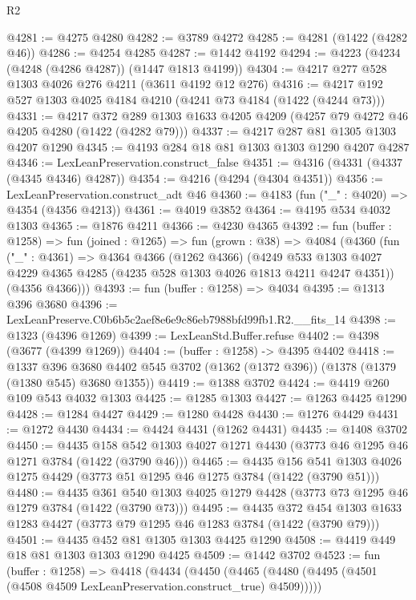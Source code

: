 \begin{lexlean}{R2}
\begin{coremodule}
@4281 := @4275 @4280
@4282 := @3789 @4272
@4285 := @4281 (@1422 (@4282 @46))
@4286 := @4254 @4285
@4287 := @1442 @4192
@4294 := @4223 (@4234 (@4248 (@4286 @4287)) (@1447 @1813 @4199))
@4304 := @4217 @277 @528 @1303 @4026 @276 @4211 (@3611 @4192 @12 @276)
@4316 := @4217 @192 @527 @1303 @4025 @4184 @4210 (@4241 @73 @4184 (@1422 (@4244 @73)))
@4331 := @4217
    @372
    @289
    @1303
    @1633
    @4205
    @4209
    (@4257 @79 @4272 @46 @4205 @4280 (@1422 (@4282 @79)))
@4337 := @4217 @287 @81 @1305 @1303 @4207 @1290
@4345 := @4193 @284 @18 @81 @1303 @1303 @1290 @4207 @4287
@4346 := LexLeanPreservation.construct_false
@4351 := @4316 (@4331 (@4337 (@4345 @4346) @4287))
@4354 := @4216 (@4294 (@4304 @4351))
@4356 := LexLeanPreservation.construct_adt @46
@4360 := @4183 (fun ("_" : @4020) => @4354 (@4356 @4213))
@4361 := @4019 @3852
@4364 := @4195 @534 @4032 @1303
@4365 := @1876 @4211
@4366 := @4230 @4365
@4392 := fun (buffer : @1258) =>
  fun (joined : @1265) =>
  fun (grown : @38) =>
  @4084
    (@4360
      (fun ("_" : @4361) =>
      @4364
        @4366
        (@1262 @4366)
        (@4249 @533 @1303 @4027 @4229 @4365 @4285 (@4235 @528 @1303 @4026 @1813 @4211 @4247 @4351))
        (@4356 @4366)))
@4393 := fun (buffer : @1258) => @4034
@4395 := @1313 @396 @3680
@4396 := LexLeanPreserve.C0b6b5c2aef8e6e9c86eb7988bfd99fb1.R2.__fits_14
@4398 := @1323 (@4396 @1269)
@4399 := LexLeanStd.Buffer.refuse
@4402 := @4398 (@3677 (@4399 @1269))
@4404 := (buffer : @1258) -> @4395 @4402
@4418 := @1337
    @396
    @3680
    @4402
    @545
    @3702
    (@1362 (@1372 @396))
    (@1378 (@1379 (@1380 @545) @3680 @1355))
@4419 := @1388 @3702
@4424 := @4419 @260 @109 @543 @4032 @1303
@4425 := @1285 @1303
@4427 := @1263 @4425 @1290
@4428 := @1284 @4427
@4429 := @1280 @4428
@4430 := @1276 @4429
@4431 := @1272 @4430
@4434 := @4424 @4431 (@1262 @4431)
@4435 := @1408 @3702
@4450 := @4435
    @158
    @542
    @1303
    @4027
    @1271
    @4430
    (@3773 @46 @1295 @46 @1271 @3784 (@1422 (@3790 @46)))
@4465 := @4435
    @156
    @541
    @1303
    @4026
    @1275
    @4429
    (@3773 @51 @1295 @46 @1275 @3784 (@1422 (@3790 @51)))
@4480 := @4435
    @361
    @540
    @1303
    @4025
    @1279
    @4428
    (@3773 @73 @1295 @46 @1279 @3784 (@1422 (@3790 @73)))
@4495 := @4435
    @372
    @454
    @1303
    @1633
    @1283
    @4427
    (@3773 @79 @1295 @46 @1283 @3784 (@1422 (@3790 @79)))
@4501 := @4435 @452 @81 @1305 @1303 @4425 @1290
@4508 := @4419 @449 @18 @81 @1303 @1303 @1290 @4425
@4509 := @1442 @3702
@4523 := fun (buffer : @1258) =>
  @4418
    (@4434
      (@4450 (@4465 (@4480 (@4495 (@4501 (@4508 @4509 LexLeanPreservation.construct_true) @4509)))))

\end{coremodule}
\end{lexlean}

